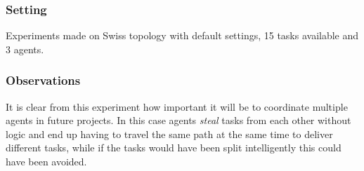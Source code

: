 \documentclass[11pt]{article}
\begin{document}
\subsubsection{Setting}
Experiments made on Swiss topology with default settings, 15 tasks available and 3 agents.

\subsubsection{Observations}
It is clear from this experiment how important it will be to coordinate multiple agents in future projects. In this case agents \textit{steal} tasks from each other without logic and end up having to travel the same path at the same time to deliver different tasks, while if the tasks would have been split intelligently this could have been avoided.
\end{document}
